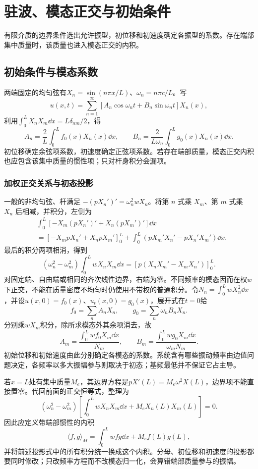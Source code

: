 \section{驻波、模态正交与初始条件}

有限介质的边界条件选出允许振型，初位移和初速度确定各振型的系数。存在端部集中质量时，该质量也进入模态正交的内积。



\subsection{初始条件与模态系数}
\label{sec:complete7-initial}
两端固定的均匀弦有$X_n=\sin(n\pi x/L)$、$\omega_n=n\pi c/L$。写
\[
 u(x,t)=\sum_{n=1}^\infty
 [A_n\cos\omega_nt+B_n\sin\omega_nt]X_n(x),
\]
利用$\int_0^L X_nX_m\dd x=L\delta_{nm}/2$，得
\[
 A_n=\frac2L\int_0^Lf_0(x)X_n(x)\dd x,\qquad
 B_n=\frac2{L\omega_n}\int_0^Lg_0(x)X_n(x)\dd x.
\]
初位移确定余弦项系数，初速度确定正弦项系数。若存在端部质量，模态正交内积也应包含该集中质量的惯性项；只对杆身积分会漏项。


\subsubsection{加权正交关系与初态投影}
一般的非均匀弦、杆满足 $-(pX_n')'=\omega_n^2wX_n$。将第 $n$ 式乘 $X_m$、第 $m$ 式乘 $X_n$ 后相减，并积分，左侧为
\[
\begin{aligned}
&\int_0^L[-X_m(pX_n')'+X_n(pX_m')']\dd x\\
&=[-X_mpX_n'+X_npX_m']_0^L
+\int_0^L(pX_m'X_n'-pX_n'X_m')\dd x.
\end{aligned}
\]
最后的积分两项相消，得到
\[(\omega_n^2-\omega_m^2)\int_0^LwX_nX_m\dd x
=[p(X_nX_m'-X_mX_n')]_0^L.
\]
对固定端、自由端或相同的齐次线性边界，右端为零。不同频率的模态因而在权$w$下正交，不能在质量密度不均匀时仍使用不带权的普通积分。令$N_n=\int_0^LwX_n^2\dd x$，并设$u(x,0)=f_0(x)$、$u_t(x,0)=g_0(x)$，展开式在$t=0$给
\[f_0=\sum_nA_nX_n,\qquad
g_0=\sum_n\omega_nB_nX_n.
\]
分别乘$wX_m$积分，除所求模态外其余项消去，故
\[A_m=\frac{\int_0^Lwf_0X_m\dd x}{N_m},\qquad
B_m=\frac{\int_0^Lwg_0X_m\dd x}{\omega_mN_m}.
\]
初始位移和初始速度由此分别确定各模态的系数。系统含有哪些振动频率由边值问题决定，各频率以多大振幅参与则取决于初态；基频最低并不保证它占主导。

若$x=L$处有集中质量$M_e$，其边界方程是$pX'(L)=M_e\omega^2X(L)$，边界项不能直接置零。代回前面的正交恒等式，整理为
\[(\omega_n^2-\omega_m^2)
\left[\int_0^LwX_nX_m\dd x+M_eX_n(L)X_m(L)\right]=0.
\]
因此应定义带端部惯性的内积
\[\langle f,g\rangle_M=\int_0^Lwfg\dd x+M_ef(L)g(L),
\]
并将前述投影式中的所有积分统一换成这个内积。分母、初位移和初速度的投影都要同时修改；只改频率方程而不改模态归一化，会算错端部质量参与的振幅。

